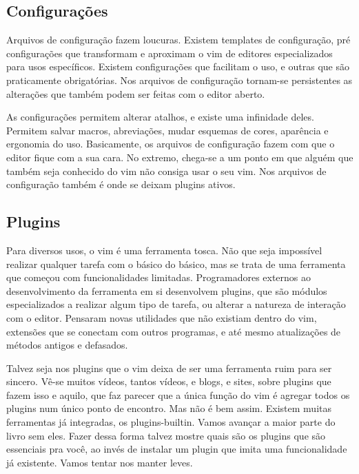 
\subsection{Configurações}
Arquivos de configuração fazem loucuras.
Existem templates de configuração, pré configurações que transformam
e aproximam o vim de editores especializados para usos específicos.
Existem configurações que facilitam o uso, e outras que são praticamente obrigatórias.
Nos arquivos de configuração tornam-se persistentes as alterações que também podem ser feitas com o editor aberto.

As configurações permitem alterar atalhos, e existe uma infinidade deles.
Permitem salvar macros, abreviações, mudar esquemas de cores, aparência e ergonomia do uso.
Basicamente, os arquivos de configuração fazem com que o editor fique com a sua cara.
No extremo, chega-se a um ponto em que alguém que também seja conhecido do vim não consiga usar o seu vim.
Nos arquivos de configuração também é onde se deixam plugins ativos.


\subsection{Plugins}
Para diversos usos, o vim é uma ferramenta tosca.
Não que seja impossível realizar qualquer tarefa com o básico do básico,
mas se trata de uma ferramenta que começou com funcionalidades limitadas.
Programadores externos ao desenvolvimento da ferramenta em si desenvolvem plugins,
que são módulos especializados a realizar algum tipo de tarefa, ou alterar a natureza
de interação com o editor.
Pensaram novas utilidades que não existiam dentro do vim, extensões que se conectam com outros programas,
e até mesmo atualizações de métodos antigos e defasados.

Talvez seja nos plugins que o vim deixa de ser uma ferramenta ruim para ser sincero.
Vê-se muitos vídeos, tantos vídeos, e blogs, e sites, sobre plugins que fazem isso e aquilo,
que faz parecer que a única função do vim é agregar todos os plugins num único ponto de encontro.
Mas não é bem assim.
Existem muitas ferramentas já integradas, os plugins-builtin.
Vamos avançar a maior parte do livro sem eles.
Fazer dessa forma talvez mostre quais são os plugins que são essenciais pra você,
ao invés de instalar um plugin que imita uma funcionalidade já existente.
Vamos tentar nos manter leves.

